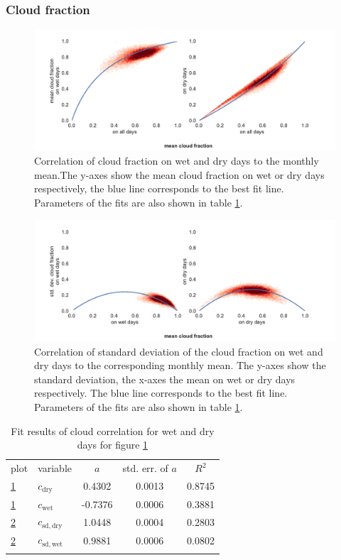 \begin{refsection}
\subsubsection{Cloud fraction}
\begin{figure}
	\includegraphics[width=12cm]{Figures/f08.pdf}
	\caption[Correlation of cloud fraction on wet and dry days to the monthly mean]{Correlation of cloud fraction on wet and dry days to the monthly mean.The y-axes show the mean cloud fraction on wet or dry days respectively, the blue line corresponds to the best fit line. Parameters of the fits are also shown in table \ref{tab:cloud-corr}.}
	\label{fig:cloud}
\end{figure}
\begin{figure}
	\includegraphics[width=12cm]{Figures/f09.pdf}
	\caption[Correlation of standard deviation of cloud fraction to the monthly mean]{Correlation of standard deviation of the cloud fraction on wet and dry days to the corresponding monthly mean. The y-axes show the standard deviation, the x-axes the mean on wet or dry days respectively. The blue line corresponds to the best fit line. Parameters of the fits are also shown in table \ref{tab:cloud-corr}.}
	\label{fig:cloud_sd}
\end{figure}
\begin{table}[t]
	\caption[Fit results of cloud correlation for wet and dry days.]{Fit results of cloud correlation for wet and dry days for figure \ref{fig:cloud}}
	\label{tab:cloud-corr}
	\begin{tabular}{llccc}
		\tophline
		plot &                         variable &     $a$ & std. err. of $a$ &  $R^2$ \\
		\middlehline
		\ref{fig:cloud} &  $c_{\mathrm{dry}}$ & 0.4302 & 0.0013 & 0.8745 \\
		\ref{fig:cloud} &  $c_{\mathrm{wet}}$ & -0.7376 & 0.0006 & 0.3881 \\
		\ref{fig:cloud_sd} &  $c_{\mathrm{sd}, \mathrm{dry}}$ & 1.0448 & 0.0004 & 0.2803 \\
		\ref{fig:cloud_sd} &  $c_{\mathrm{sd}, \mathrm{wet}}$ & 0.9881 & 0.0006 & 0.0802 \\
		\bottomhline
	\end{tabular}
\end{table}


\end{refsection}
